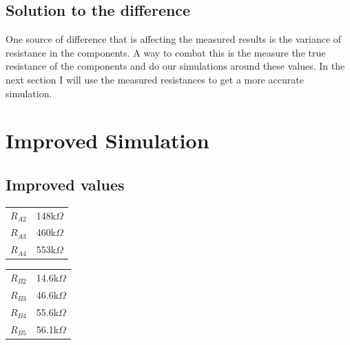 \documentclass[12pt]{article}
\begin{document}
\subsection{Solution to the difference}

One source of difference that is affecting the measured results is the variance of resistance in the components.
A way to combat this is the measure the true resistance of the components and do our simulations around these values.
In the next section I will use the measured resistances to get a more accurate simulation.

\clearpage

\section{Improved Simulation}

\subsection{Improved values}

\begin{multicols}{2}
	\begin{center}
		\begin{tabular}{c|c}
			$R_{A2}$ & 148k$\Omega$ \\
			$R_{A3}$ & 460k$\Omega$ \\
			$R_{A4}$ & 553k$\Omega$ \\
		\end{tabular}
	\end{center}
	\begin{center}
		\begin{tabular}{c|c}
			$R_{B2}$ & 14.6k$\Omega$ \\
			$R_{B3}$ & 46.6k$\Omega$ \\
			$R_{B4}$ & 55.6k$\Omega$ \\
			$R_{B5}$ & 56.1k$\Omega$ \\
		\end{tabular}
	\end{center}
\end{multicols}
\end{document}
